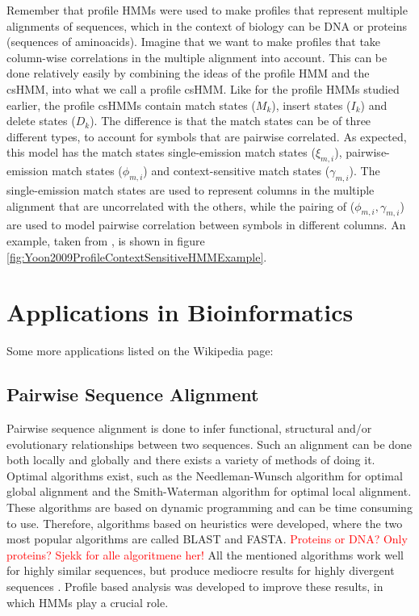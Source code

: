 \documentclass{article}
\begin{document}
Remember that profile HMMs were used to make profiles that represent multiple alignments of sequences, which in the context of biology can be DNA or proteins (sequences of aminoacids). Imagine that we want to make profiles that take column-wise correlations in the multiple alignment into account. This can be done relatively easily by combining the ideas of the profile HMM and the csHMM, into what we call a profile csHMM. Like for the profile HMMs studied earlier, the profile csHMMs contain match states ($M_k$), insert states ($I_k$) and delete states ($D_k$). The difference is that the match states can be of three different types, to account for symbols that are pairwise correlated. As expected, this model has the match states single-emission match states ($\xi_{m,i}$),  pairwise-emission match states ($\phi_{m,i}$) and context-sensitive match states ($\gamma_{m,i}$). The single-emission match states are used to represent columns in the multiple alignment that are uncorrelated with the others, while the pairing of ($\phi_{m,i}, \gamma_{m,i}$) are used to model pairwise correlation between symbols in different columns. An example, taken from \cite{Yoon2009}, is shown in figure \ref{fig:Yoon2009ProfileContextSensitiveHMMExample}.

\section{Applications in Bioinformatics}
Some more applications listed on the Wikipedia page: 

\subsection{Pairwise Sequence Alignment}
Pairwise sequence alignment is done to infer functional, structural and/or evolutionary relationships between two sequences. Such an alignment can be done both locally and globally and there exists a variety of methods of doing it. Optimal algorithms exist, such as the Needleman-Wunsch algorithm for optimal global alignment and the Smith-Waterman algorithm for optimal local alignment. These algorithms are based on dynamic programming and can be time consuming to use. Therefore, algorithms based on heuristics were developed, where the two most popular algorithms are called BLAST and FASTA. \textcolor{red}{Proteins or DNA? Only proteins? Sjekk for alle algoritmene her!} All the mentioned algorithms work well for highly similar sequences, but produce mediocre results for highly divergent sequences \cite{Choo2004}. Profile based analysis was developed to improve these results, in which HMMs play a crucial role. 
\end{document}
